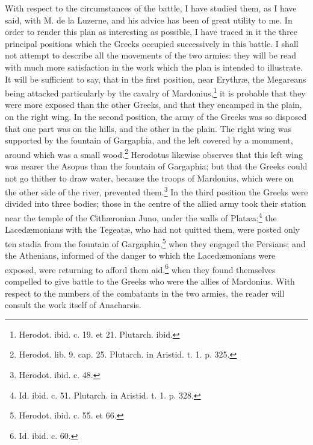 \documentclass[a4paper, 11pt, oneside, polutonikogreek, english]{article}
\begin{document}
With respect to the circumstances of the battle, I have studied them, as I have said, with M. de la Luzerne, and his advice has been of great utility to me. In order to render this plan as interesting as possible, I have traced in it the three principal positions which the Greeks occupied successively in this battle. I shall not attempt to describe all the movements of the two armies: they will be read with much more satisfaction in the work which the plan is intended to illustrate. It will be sufficient to say, that in the first position, near Erythræ, the Megareans being attacked particularly by the cavalry of Mardonius,\footnote{Herodot. ibid. c. 19. et 21. Plutarch. ibid.} it is probable that they were more exposed than the other Greeks, and that they encamped in the plain, on the right wing. In the second position, the army of the Greeks was so disposed that one part was on the hills, and the other in the plain. The right wing was supported by the fountain of Gargaphia, and the left covered by a monument, around which was a small wood.\footnote{Herodot. lib. 9. cap. 25. Plutarch. in Aristid. t. 1. p. 325.} Herodotus likewise observes that this left wing was nearer the Asopus than the fountain of Gargaphia; but that the Greeks could not go thither to draw water, because the troops of Mardonius, which were on the other side of the river, prevented them.\footnote{Herodot. ibid. c. 48.} In the third position the Greeks were divided into three bodies; those in the centre of the allied army took their station near the temple of the Cithæronian Juno, under the walls of Platæa;\footnote{Id. ibid. c. 51. Plutarch. in Aristid. t. 1. p. 328.} the Lacedæmonians with the Tegeatæ, who had not quitted them, were posted only ten stadia from the fountain of Gargaphia,\footnote{Herodot. ibid. c. 55. et 66.} when they engaged the Persians; and the Athenians, informed of the danger to which the Lacedæmonians were exposed, were returning to afford them aid,\footnote{Id. ibid. c. 60.} when they found themselves compelled to give battle to the Greeks who were the allies of Mardonius. With respect to the numbers of the combatants in the two armies, the reader will consult the work itself of Anacharsis.
\end{document}
